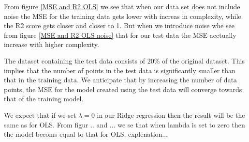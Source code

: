\thispagestyle{plain}

\noindent From figure \eqref{MSE and R2 OLS} we see that when our data set does not include noise
the MSE for the training data gets lower with increas in complexity, while 
the R2 score gets closer and closer to 1. But when we introduce noise whe see from figure \eqref{MSE and R2 OLS noise}
that for our test data the MSE acctually increase with higher complexity. 

The dataset containing the test data consists of $20\%$ of the original
dataset. This implies that the number of points in the test data is 
significantly smaller than that in the training data. We anticipate 
that by increasing the number of data points, the MSE for the model 
created using the test data will converge towards that of the training
model.

We expect that if we set $\lambda = 0$ in our Ridge regression then the result 
will be the same as for OLS. From figur .. and ... we se that when lambda is 
set to zero then the model becoms equal to that for OLS, explenation...